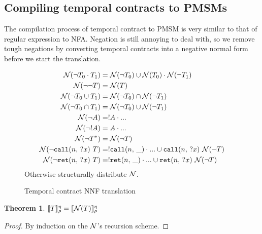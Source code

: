 \documentclass[preprint,onecolumn,9pt]{sigplanconf} %
\newtheorem{theorem}{Theorem}
\begin{document}
\subsection{Compiling temporal contracts to PMSMs}
%
The compilation process of temporal contract to PMSM is very similar to that of regular expression to NFA.
%
Negation is still annoying to deal with, so we remove tough negations by converting temporal contracts into a negative normal form before we start the translation.
%
\begin{figure}
  \begin{align*}
    {\mathcal N}(\neg T_0 \cdot T_1) &=
      {\mathcal N}(\neg T_0) \cup {\mathcal N}(T_0) \cdot {\mathcal N}(\neg T_1)
\\
    {\mathcal N}(\neg \neg T) &= {\mathcal N}(T)
\\
    {\mathcal N}(\neg T_0 \cup T_1) &= {\mathcal N}(\neg T_0) \cap {\mathcal N}(\neg T_1)
\\
    {\mathcal N}(\neg T_0 \cap T_1) &= {\mathcal N}(\neg T_0) \cup {\mathcal N}(\neg T_1)
\\
    {\mathcal N}(\neg A) &= ! A \cdot {\tt ...}
\\
    {\mathcal N}(\neg ! A) &= A \cdot {\tt ...}
\\
    {\mathcal N}(\neg T^*) &= {\mathcal N}(\neg T)
\\
    {\mathcal N}(\neg {\tt call}(n,\, {\tt ?}x)\ T) &= ! {\tt call}(n,\, \_) \cdot {\tt ...} \cup {\tt call}(n,\, {\tt ?}x)\ {\mathcal N}(\neg T)
\\
    {\mathcal N}(\neg {\tt ret}(n,\, {\tt ?}x)\ T) &= ! {\tt ret}(n,\, \_) \cdot {\tt ...} \cup {\tt ret}(n,\, {\tt ?}x)\ {\mathcal N}(\neg T)
  \end{align*}
  Otherwise structurally distribute ${\mathcal N}$.
  \caption{Temporal contract NNF translation}
  \label{fig:nnf}
\end{figure}
\begin{theorem}
  $[\![ T ]\!]^{\eta}_{\rho} = [\![ {\mathcal N}(T) ]\!]^{\eta}_{\rho}$
\end{theorem}
\begin{proof}
  By induction on the ${\mathcal N}$'s recursion scheme.
\end{proof}
\end{document}
